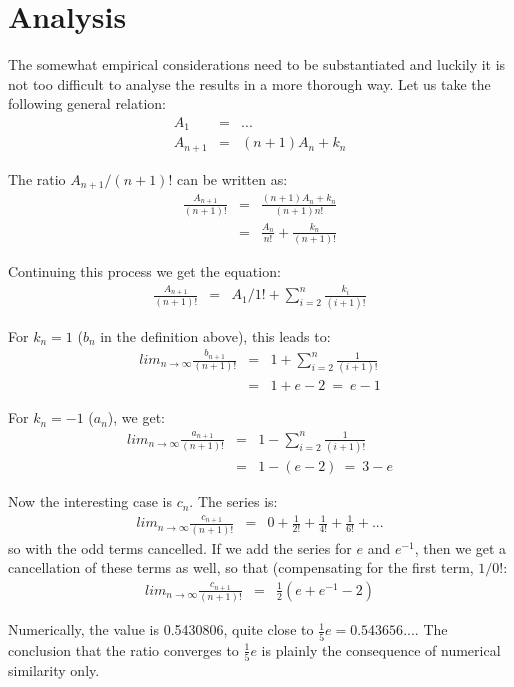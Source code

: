 \documentclass[onecolumn]{article}
\begin{document}
\section*{Analysis}
The somewhat empirical considerations need to be substantiated and luckily it is not too difficult to
analyse the results in a more thorough way. Let us take the following general relation:
\begin{eqnarray}
    A_1 &=& ... \\
    A_{n+1} &=& (n+1) A_n + k_n
\end{eqnarray}

The ratio $A_{n+1} / (n+1)!$ can be written as:
\begin{eqnarray}
    \frac{A_{n+1}}{(n+1)!} &=& \frac{(n+1) A_n + k_n}{(n+1) n!} \\
                           &=& \frac{A_n}{n!} + \frac{k_n}{(n+1)!}
\end{eqnarray}

Continuing this process we get the equation:
\begin{eqnarray}
    \frac{A_{n+1}}{(n+1)!} &=& A_1/1! + \sum_{i=2}^n \frac{k_i}{(i+1)!}
\end{eqnarray}

For $k_n = 1$ ($b_n$ in the definition above), this leads to:
\begin{eqnarray}
    lim_{n \rightarrow \infty} \frac{b_{n+1}}{(n+1)!} &=& 1 + \sum_{i=2}^n \frac{1}{(i+1)!} \\
                                                     &=& 1 + e-2 ~=~ e-1
\end{eqnarray}

For $k_n = -1$ ($a_n$), we get:
\begin{eqnarray}
    lim_{n \rightarrow \infty} \frac{a_{n+1}}{(n+1)!} &=& 1 - \sum_{i=2}^n \frac{1}{(i+1)!} \\
                                                      &=& 1 - (e-2) ~=~ 3 - e
\end{eqnarray}

Now the interesting case is $c_n$. The series is:
\begin{eqnarray}
    lim_{n \rightarrow \infty} \frac{c_{n+1}}{(n+1)!} &=& 0 + \frac{1}{2!} + \frac{1}{4!} + \frac{1}{6!} + ...
\end{eqnarray}
\noindent so with the odd terms cancelled. If we add the series for $e$ and $e^{-1}$, then we get a cancellation
of these terms as well, so that (compensating for the first term, $1/0!$:
\begin{eqnarray}
    lim_{n \rightarrow \infty} \frac{c_{n+1}}{(n+1)!} &=& \frac{1}{2} \left(e + e^{-1} - 2 \right)
\end{eqnarray}

Numerically, the value is 0.5430806, quite close to $\frac{1}{5} e = 0.543656...$. The conclusion that the
ratio converges to $\frac{1}{5} e$ is plainly the consequence of numerical similarity only.
\end{document}
